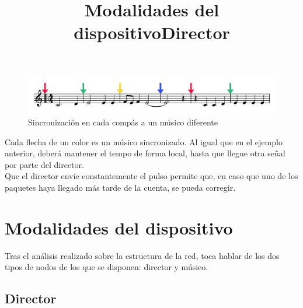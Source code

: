 \begin{figure}[!htb]
\centering
\includegraphics[width=1\textwidth]{./imagenes/sincrocompas}
\caption{Sincronización en cada compás a un músico diferente} \label{fig:sincrocompas}
\end{figure}

Cada flecha de un color es un músico sincronizado. Al igual que en el ejemplo anterior,
deberá mantener el tempo de forma local, hasta que llegue otra señal por parte del director.\\

Que el director envíe constantemente el pulso permite que, en caso que uno de los
paquetes haya llegado más tarde de la cuenta, se pueda corregir.\\


\section{Modalidades del dispositivo}
\title{Modalidades del dispositivo}

Tras el análisis realizado sobre la estructura de la red, toca hablar de los dos tipos
de nodos de los que se disponen: director y músico.

\subsection{Director}
\title{Director}
